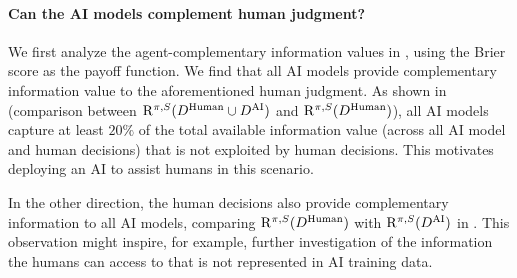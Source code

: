 \paragraph{Can the AI models complement human judgment?} 
We first analyze the agent-complementary information values in , using the Brier score as the payoff function.
We find that all AI models provide complementary information value to the aforementioned human judgment.
As shown in  (comparison between \textcolor{humanaidecision}{$\mathrm{R}^{\pi, S}(D^{\text{Human}} \cup D^{\text{AI}})$} and \textcolor{humandecision}{$\mathrm{R}^{\pi, S}(D^{\text{Human}})$}), all AI models capture at least $20\%$ of the total available information value (across all AI model and human decisions) that is not exploited by human decisions. This motivates deploying an AI to assist humans in this scenario.


In the other direction, the human decisions also provide complementary information to all AI models, comparing \textcolor{humandecision}{$\mathrm{R}^{\pi, S}(D^{\text{Human}})$} with \textcolor{aidecision}{$\mathrm{R}^{\pi, S}(D^{\text{AI}})$} in .
This observation might inspire, for example, further investigation of the information the humans can access to that is not represented in AI training data.

